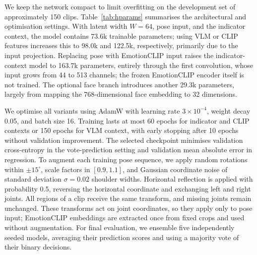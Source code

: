 We keep the network compact to limit overfitting on the development set of approximately 150 clips. Table~\ref{tab:hparams} summarises the architectural and optimisation settings. With latent width $W=64$, pose input, and the indicator context, the model contains 73.6k trainable parameters; using VLM or CLIP features increases this to 98.0k and 122.5k, respectively, primarily due to the input projection. Replacing pose with EmotionCLIP input raises the indicator-context model to 163.7k parameters, entirely through the first convolution, whose input grows from 44 to 513 channels; the frozen EmotionCLIP encoder itself is not trained. The optional face branch introduces another 29.3k parameters, largely from mapping the 768-dimensional face embedding to 32 dimensions.

We optimise all variants using AdamW with learning rate $3\times10^{-4}$, weight decay 0.05, and batch size 16. Training lasts at most 60 epochs for indicator and CLIP contexts or 150 epochs for VLM context, with early stopping after 10 epochs without validation improvement. The selected checkpoint minimises validation cross-entropy in the vote-prediction setting and validation mean absolute error in regression. To augment each training pose sequence, we apply random rotations within $\pm15^\circ$, scale factors in $[0.9,1.1]$, and Gaussian coordinate noise of standard deviation $\sigma=0.02$ shoulder widths. Horizontal reflection is applied with probability 0.5, reversing the horizontal coordinate and exchanging left and right joints. All regions of a clip receive the same transform, and missing joints remain unchanged. These transforms act on joint coordinates, so they apply only to pose input; EmotionCLIP embeddings are extracted once from fixed crops and used without augmentation. For final evaluation, we ensemble five independently seeded models, averaging their prediction scores and using a majority vote of their binary decisions.

